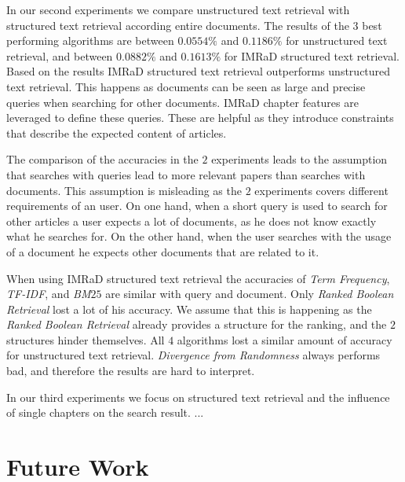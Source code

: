 In our second experiments we compare unstructured text retrieval with structured text retrieval according entire documents. The results of the $3$ best performing algorithms are between $0.0554\%$ and $0.1186\%$ for unstructured text retrieval, and between $0.0882\%$ and $0.1613\%$ for IMRaD structured text retrieval. Based on the results IMRaD structured text retrieval outperforms unstructured text retrieval. This happens as documents can be seen as large and precise queries when searching for other documents. IMRaD chapter features are leveraged to define these queries. These are helpful as they introduce constraints that describe the expected content of articles.

The comparison of the accuracies in the $2$ experiments leads to the assumption that searches with queries lead to more relevant papers than searches with documents. This assumption is misleading as the $2$ experiments covers different requirements of an user. On one hand, when a short query is used to search for other articles a user expects a lot of documents, as he does not know exactly what he searches for. On the other hand, when the user searches with the usage of a document he expects other documents that are related to it.

When using IMRaD structured text retrieval the accuracies of \textit{Term Frequency}, \textit{TF-IDF}, and \textit{BM$25$} are similar with query and document. Only \textit{Ranked Boolean Retrieval} lost a lot of his accuracy. We assume that this is happening as the \textit{Ranked Boolean Retrieval} already provides a structure for the ranking, and the $2$ structures hinder themselves. All $4$ algorithms lost a similar amount of accuracy for unstructured text retrieval. \textit{Divergence from Randomness} always performs bad, and therefore the results are hard to interpret.

In our third experiments we focus on structured text retrieval and the influence of single chapters on the search result. ...


\section{Future Work}
\label{sec:future_work}





